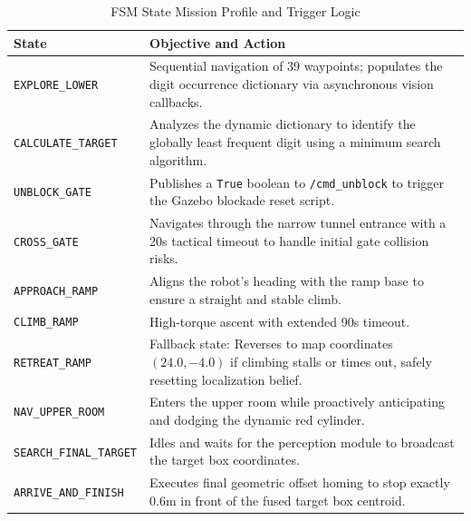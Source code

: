 \documentclass[11pt, a4paper]{article}
\begin{document}
\begin{table}[htbp]
\centering
\caption{FSM State Mission Profile and Trigger Logic}
\label{tab:fsm_states}
\begin{tabular}{@{}lp{10cm}@{}}
\toprule
\textbf{State} & \textbf{Objective and Action} \\ \midrule
\texttt{EXPLORE\_LOWER} & Sequential navigation of 39 waypoints; populates the digit occurrence dictionary via asynchronous vision callbacks. \\
\texttt{CALCULATE\_TARGET} & Analyzes the dynamic dictionary to identify the globally least frequent digit using a minimum search algorithm. \\
\texttt{UNBLOCK\_GATE} & Publishes a \texttt{True} boolean to \texttt{/cmd\_unblock} to trigger the Gazebo blockade reset script. \\
\texttt{CROSS\_GATE} & Navigates through the narrow tunnel entrance with a 20s tactical timeout to handle initial gate collision risks. \\
\texttt{APPROACH\_RAMP} & Aligns the robot's heading with the ramp base to ensure a straight and stable climb. \\
\texttt{CLIMB\_RAMP} & High-torque ascent with extended 90s timeout. \\
\texttt{RETREAT\_RAMP} & Fallback state: Reverses to map coordinates $(24.0, -4.0)$ if climbing stalls or times out, safely resetting localization belief. \\
\texttt{NAV\_UPPER\_ROOM} & Enters the upper room while proactively anticipating and dodging the dynamic red cylinder. \\
\texttt{SEARCH\_FINAL\_TARGET} & Idles and waits for the perception module to broadcast the target box coordinates. \\
\texttt{ARRIVE\_AND\_FINISH} & Executes final geometric offset homing to stop exactly 0.6m in front of the fused target box centroid. \\
\bottomrule
\end{tabular}
\end{table}
\end{document}
